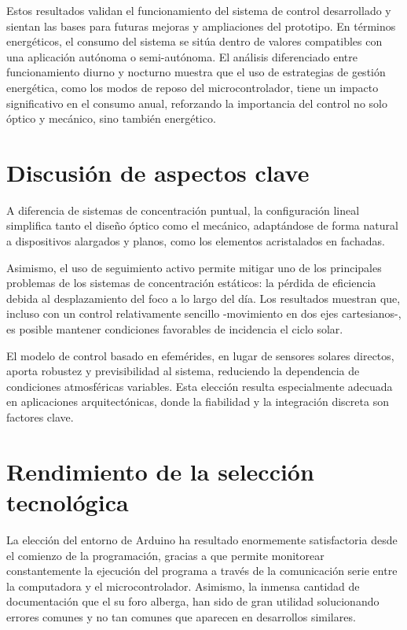 Estos resultados validan el funcionamiento del sistema de control desarrollado y sientan las bases para futuras mejoras y ampliaciones del prototipo.
En términos energéticos, el consumo del sistema se sitúa dentro de valores compatibles con una aplicación autónoma o semi-autónoma. El análisis diferenciado entre funcionamiento diurno y nocturno muestra que el uso de estrategias de gestión energética, como los modos de reposo del microcontrolador, tiene un impacto significativo en el consumo anual, reforzando la importancia del control no solo óptico y mecánico, sino también energético. 

\section{Discusión de aspectos clave}

A diferencia de sistemas de concentración puntual, la configuración lineal simplifica tanto el diseño óptico como el mecánico, adaptándose de forma natural a dispositivos alargados y planos, como los elementos acristalados en fachadas.

Asimismo, el uso de seguimiento activo permite mitigar uno de los principales problemas de los sistemas de concentración estáticos: la pérdida de eficiencia debida al desplazamiento del foco a lo largo del día. Los resultados muestran que, incluso con un control relativamente sencillo -movimiento en dos ejes cartesianos-, es posible mantener condiciones favorables de incidencia el ciclo solar.

El modelo de control basado en efemérides, en lugar de sensores solares directos, aporta robustez y previsibilidad al sistema, reduciendo la dependencia de condiciones atmosféricas variables. Esta elección resulta especialmente adecuada en aplicaciones arquitectónicas, donde la fiabilidad y la integración discreta son factores clave.

\section{Rendimiento de la selección tecnológica}

La elección del entorno de Arduino ha resultado enormemente satisfactoria desde el comienzo de la programación, gracias a que permite monitorear constantemente la ejecución del programa a través de la comunicación serie entre la computadora y el microcontrolador. Asimismo, la inmensa cantidad de documentación que el su foro alberga, han sido de gran utilidad solucionando errores comunes y no tan comunes que aparecen en desarrollos similares.

